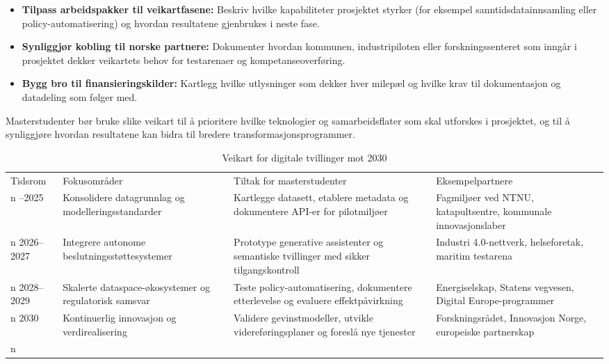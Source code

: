 \begin{itemize}
    \item \textbf{Tilpass arbeidspakker til veikartfasene:} Beskriv hvilke kapabiliteter prosjektet styrker (for eksempel sanntidsdatainnsamling eller policy-automatisering) og hvordan resultatene gjenbrukes i neste fase.
    \item \textbf{Synliggjør kobling til norske partnere:} Dokumenter hvordan kommunen, industripiloten eller forskningssenteret som inngår i prosjektet dekker veikartets behov for testarenaer og kompetanseoverføring.
    \item \textbf{Bygg bro til finansieringskilder:} Kartlegg hvilke utlysninger som dekker hver milepæl og hvilke krav til dokumentasjon og datadeling som følger med.
\end{itemize}

Masterstudenter bør bruke slike veikart til å prioritere hvilke teknologier og samarbeidsflater som skal utforskes i prosjektet, og til å synliggjøre hvordan resultatene kan bidra til bredere transformasjonsprogrammer.

\begin{table}[h]
    \centering
    \caption{Veikart for digitale tvillinger mot 2030}
    \label{tab:roadmap2030}
    \begin{tabular}{p{2.4cm}p{4.1cm}p{4.1cm}p{3.0cm}}
        \toprule
        Tidsrom & Fokusområder & Tiltak for masterstudenter & Eksempelpartnere \\n        \midrule
        2024--2025 & Konsolidere datagrunnlag og modelleringsstandarder & Kartlegge datasett, etablere metadata og dokumentere API-er for pilotmiljøer & Fagmiljøer ved NTNU, katapultsentre, kommunale innovasjonslaber \\n        2026--2027 & Integrere autonome beslutningsstøttesystemer & Prototype generative assistenter og semantiske tvillinger med sikker tilgangskontroll & Industri 4.0-nettverk, helseforetak, maritim testarena \\n        2028--2029 & Skalerte dataspace-økosystemer og regulatorisk samsvar & Teste policy-automatisering, dokumentere etterlevelse og evaluere effektpåvirkning & Energiselskap, Statens vegvesen, Digital Europe-programmer \\n        2030 & Kontinuerlig innovasjon og verdirealisering & Validere gevinstmodeller, utvikle videreføringsplaner og foreslå nye tjenester & Forskningsrådet, Innovasjon Norge, europeiske partnerskap \\n        \bottomrule
    \end{tabular}
\end{table}

